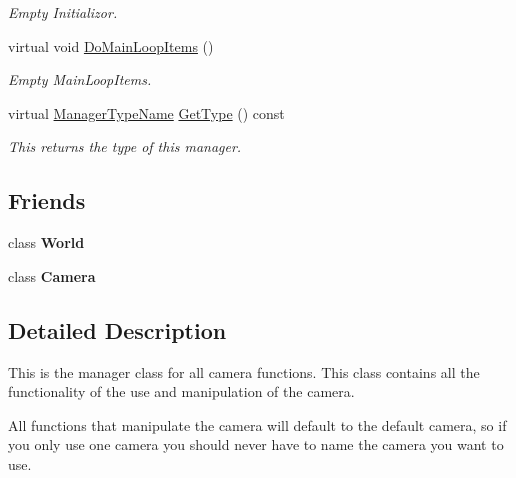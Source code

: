 \begin{DoxyCompactItemize}
\begin{DoxyCompactList}\small\item\em Empty Initializor. \item\end{DoxyCompactList}\item 
virtual void \hyperlink{classphys_1_1CameraManager_aaae22266bccc43f6efa66d2735d7d1d3}{DoMainLoopItems} ()
\begin{DoxyCompactList}\small\item\em Empty MainLoopItems. \item\end{DoxyCompactList}\item 
virtual \hyperlink{classphys_1_1ManagerBase_aaa6ccddf23892eaccb898529414f80a5}{ManagerTypeName} \hyperlink{classphys_1_1CameraManager_a8412ea634307aa280b615a3cc7c9b739}{GetType} () const 
\begin{DoxyCompactList}\small\item\em This returns the type of this manager. \item\end{DoxyCompactList}\end{DoxyCompactItemize}
\subsection*{Friends}
\begin{DoxyCompactItemize}
\item 
\hypertarget{classphys_1_1CameraManager_a7b4bcdf992c21ae83363f25df05b1d25}{
class {\bfseries World}}
\label{d9/d91/classphys_1_1CameraManager_a7b4bcdf992c21ae83363f25df05b1d25}

\item 
\hypertarget{classphys_1_1CameraManager_ad8bd9afbbd7af19d996da80e9d25890d}{
class {\bfseries Camera}}
\label{d9/d91/classphys_1_1CameraManager_ad8bd9afbbd7af19d996da80e9d25890d}

\end{DoxyCompactItemize}


\subsection{Detailed Description}
This is the manager class for all camera functions. This class contains all the functionality of the use and manipulation of the camera. \par
 All functions that manipulate the camera will default to the default camera, so if you only use one camera you should never have to name the camera you want to use. 

